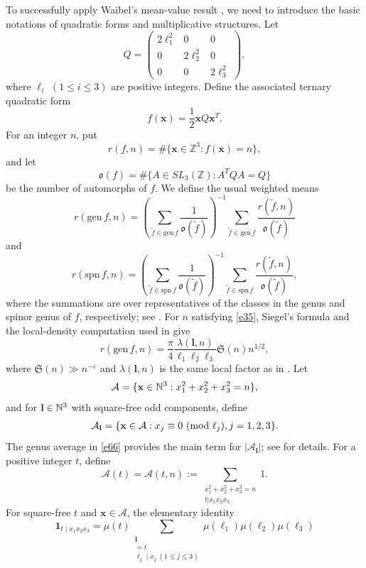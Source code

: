 \documentclass[12pt,a4paper,reqno]{amsart}
\numberwithin{equation}{section}
\def\pmod #1{\ ({\rm{mod}}\ #1)}
\theoremstyle{plain}
\theoremstyle{definition}
\begin{document}
To successfully apply Waibel's mean-value result \cite[Lemma 17]{Wa}, we need to introduce the basic notations of quadratic forms and multiplicative structures.
Let
\[
Q=\begin{pmatrix}
2\ell_1^2&0&0\\
0&2\ell_2^2&0\\
0&0&2\ell_3^2
\end{pmatrix},
\]
where $\ell_i$ $(1\leq i\leq3)$ are positive integers. Define the associated ternary quadratic form
\[
f(\mathbf x)=\frac12\mathbf xQ\mathbf x^T.
\]
For an integer $n$, put
\[
r(f,n)=\#\{\mathbf x\in\mathbb Z^3:f(\mathbf x)=n\},
\]
and let
\[
\mathfrak o(f)=\#\{A\in SL_3(\mathbb Z):A^TQA=Q\}
\]
be the number of automorphs of $f$. We define the usual weighted means
\[
r(\mathrm{gen}\,f,n)=
\left(\sum_{\widetilde f\in\mathrm{gen}\,f}\frac1{\mathfrak o(\widetilde f)}\right)^{-1}
\sum_{\widetilde f\in\mathrm{gen}\,f}\frac{r(\widetilde f,n)}{\mathfrak o(\widetilde f)}
\]
and
\[
r(\mathrm{spn}\,f,n)=
\left(\sum_{\widetilde f\in\mathrm{spn}\,f}\frac1{\mathfrak o(\widetilde f)}\right)^{-1}
\sum_{\widetilde f\in\mathrm{spn}\,f}\frac{r(\widetilde f,n)}{\mathfrak o(\widetilde f)},
\]
where the summations are over representatives of the classes in the genus and spinor genus of $f$, respectively; see \cite[Section 102]{OM}.
For $n$ satisfying \eqref{e35}, Siegel's formula and the local-density computation used in \cite{Lv} give
\begin{equation}\label{e66}
r(\mathrm{gen}\,f,n)=\frac{\pi}{4}\frac{\lambda(\mathbf l,n)}{\ell_1\ell_2\ell_3}\mathfrak S(n)n^{1/2},
\end{equation}
where $\mathfrak S(n)\gg n^{-\varepsilon}$ and $\lambda(\mathbf l,n)$ is the same local factor as in \cite[(3.10)]{Lv}.
Let
    \[
    \mathcal{A} = \{ {\bf x} \in \mathbb{N}^3 : x_1^2 + x_2^2 + x_3^2 = n \},
    \]
    and for \( {\bf l} \in \mathbb{N}^3 \) with square-free odd components, define
    \begin{align*}
    \mathcal{A}_{\bf l} = \{ {\bf x} \in \mathcal{A} : x_j\equiv0\pmod{\ell_j}, j=1,2,3 \}.
    \end{align*}
The genus average in \eqref{e66} provides the main term for $|\mathcal A_{\mathbf l}|$; see \cite{BB} for details.
For a positive integer $t$, define
\[
\mathcal{A}(t) = \mathcal{A}(t, n) := \sum_{\substack{ x_1^2 + x_2^2 + x_3^2 = n \\ t | x_1 x_2 x_3}} 1.
\]
For square-free $t$ and $\mathbf x\in\mathcal A$, the elementary identity
\[
\mathbf 1_{t\mid x_1x_2x_3}
=\mu(t)\sum_{\substack{\mathbf l\\ [\ell_1,\ell_2,\ell_3]=t\\ \ell_j\mid x_j\ (1\leq j\leq3)}}
\mu(\ell_1)\mu(\ell_2)\mu(\ell_3)
\]
\end{document}
